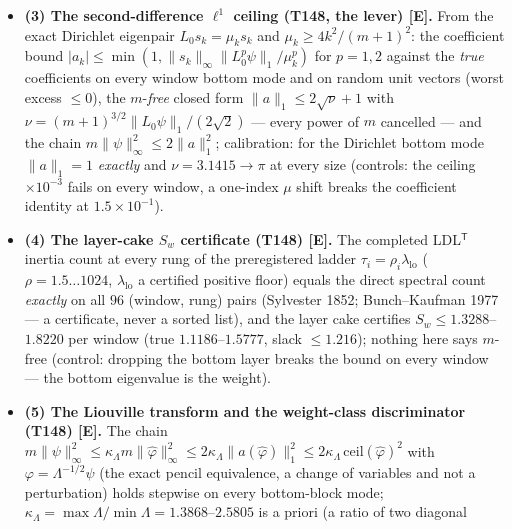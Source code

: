 \documentclass[11pt]{article}
\providecommand{\mE}{\textbf{[E]}}\providecommand{\mC}{\textbf{[C]}}
\begin{document}
\begin{itemize}[leftmargin=1.5em]
spectral projector onto $B=\{k:\lambda_k\le10\hat\lambda\}$ (preregistered rule, $|B|=3\ldots5$),
$\sum_j(\Pi_B)_{jj}=|B|$ \emph{exactly} ($3.3\times10^{-16}$), hence $Q_B\ge|B|$ is a theorem
(max $\ge$ mean); the \emph{measured} $Q_B/|B|=1.5091$--$1.7980$ lies in the preregistered band
$[1,2.2]$ against the Szeg\H{o}/Widom sharp reference $Q_B\le2|B|$ --- a measurement on a finite
list, typed as such (controls: the rank-$|B|$ coordinate projector gives $Q_B=m$ and overshoots
by $\ge3.9$, a $1\%$ basis scaling breaks the trace identity).
\item \textbf{(3) The second-difference $\ell^1$ ceiling (T148, the lever) \mE.} From the exact
Dirichlet eigenpair $L_0s_k=\mu_ks_k$ and $\mu_k\ge4k^2/(m+1)^2$: the coefficient bound
$|a_k|\le\min(1,\|s_k\|_\infty\|L_0^p\psi\|_1/\mu_k^p)$ for $p=1,2$ against the \emph{true}
coefficients on every window bottom mode and on random unit vectors (worst excess $\le0$), the
$m$-\emph{free} closed form $\|a\|_1\le2\sqrt\nu+1$ with
$\nu=(m+1)^{3/2}\|L_0\psi\|_1/(2\sqrt2)$ --- every power of $m$ cancelled --- and the chain
$m\|\psi\|_\infty^2\le2\|a\|_1^2$; calibration: for the Dirichlet bottom mode $\|a\|_1=1$
\emph{exactly} and $\nu=3.1415\to\pi$ at every size (controls: the ceiling $\times10^{-3}$ fails
on every window, a one-index $\mu$ shift breaks the coefficient identity at $1.5\times10^{-1}$).
\item \textbf{(4) The layer-cake $S_w$ certificate (T148) \mE.} The completed LDL$^{\mathsf T}$
inertia count at every rung of the preregistered ladder
$\tau_i=\rho_i\lambda_{\mathrm{lo}}$ ($\rho=1.5\ldots1024$, $\lambda_{\mathrm{lo}}$ a certified
positive floor) equals the direct spectral count \emph{exactly} on all $96$ (window, rung) pairs
(Sylvester 1852; Bunch--Kaufman 1977 --- a certificate, never a sorted list), and the layer cake
certifies $S_w\le1.3288$--$1.8220$ per window (true $1.1186$--$1.5777$, slack $\le1.216$);
nothing here says $m$-free (control: dropping the bottom layer breaks the bound on every window
--- the bottom eigenvalue is the weight).
\item \textbf{(5) The Liouville transform and the weight-class discriminator (T148) \mE.} The
chain $m\|\psi\|_\infty^2\le\kappa_\Lambda m\|\hat\varphi\|_\infty^2\le
2\kappa_\Lambda\|a(\hat\varphi)\|_1^2\le2\kappa_\Lambda\,\mathrm{ceil}(\hat\varphi)^2$ with
$\varphi=\Lambda^{-1/2}\psi$ (the exact pencil equivalence, a change of variables and not a
perturbation) holds stepwise on every bottom-block mode;
$\kappa_\Lambda=\max\Lambda/\min\Lambda=1.3868$--$2.5805$ is a priori (a ratio of two diagonal

\end{itemize}
\end{document}
